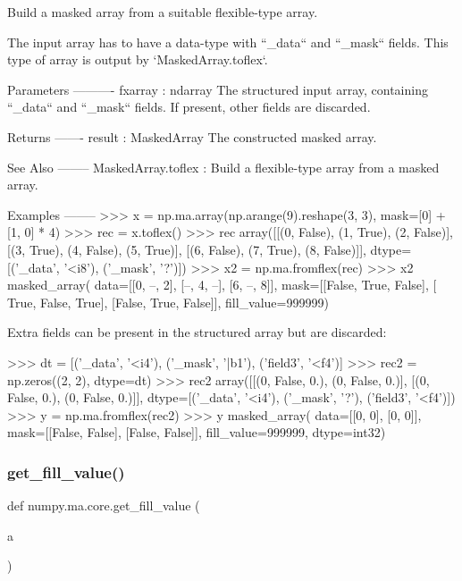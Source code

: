 \begin{DoxyVerb}Build a masked array from a suitable flexible-type array.

The input array has to have a data-type with ``_data`` and ``_mask``
fields. This type of array is output by `MaskedArray.toflex`.

Parameters
----------
fxarray : ndarray
    The structured input array, containing ``_data`` and ``_mask``
    fields. If present, other fields are discarded.

Returns
-------
result : MaskedArray
    The constructed masked array.

See Also
--------
MaskedArray.toflex : Build a flexible-type array from a masked array.

Examples
--------
>>> x = np.ma.array(np.arange(9).reshape(3, 3), mask=[0] + [1, 0] * 4)
>>> rec = x.toflex()
>>> rec
array([[(0, False), (1,  True), (2, False)],
       [(3,  True), (4, False), (5,  True)],
       [(6, False), (7,  True), (8, False)]],
      dtype=[('_data', '<i8'), ('_mask', '?')])
>>> x2 = np.ma.fromflex(rec)
>>> x2
masked_array(
  data=[[0, --, 2],
        [--, 4, --],
        [6, --, 8]],
  mask=[[False,  True, False],
        [ True, False,  True],
        [False,  True, False]],
  fill_value=999999)

Extra fields can be present in the structured array but are discarded:

>>> dt = [('_data', '<i4'), ('_mask', '|b1'), ('field3', '<f4')]
>>> rec2 = np.zeros((2, 2), dtype=dt)
>>> rec2
array([[(0, False, 0.), (0, False, 0.)],
       [(0, False, 0.), (0, False, 0.)]],
      dtype=[('_data', '<i4'), ('_mask', '?'), ('field3', '<f4')])
>>> y = np.ma.fromflex(rec2)
>>> y
masked_array(
  data=[[0, 0],
        [0, 0]],
  mask=[[False, False],
        [False, False]],
  fill_value=999999,
  dtype=int32)\end{DoxyVerb}
 \mbox{\label{namespacenumpy_1_1ma_1_1core_aef4eddde136d5c3dc7f1bce95187eb1a}} 
\subsubsection{\texorpdfstring{get\+\_\+fill\+\_\+value()}{get\_fill\_value()}}
{\footnotesize\ttfamily def numpy.\+ma.\+core.\+get\+\_\+fill\+\_\+value (\begin{DoxyParamCaption}\item[{}]{a }\end{DoxyParamCaption})}

